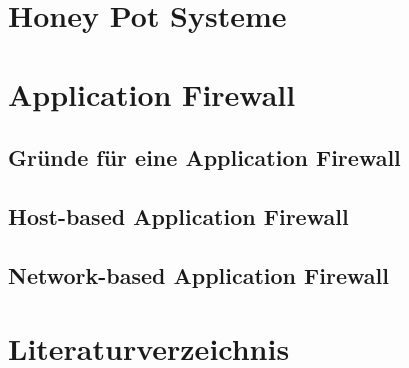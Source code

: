 \documentclass[11pt]{scrartcl}
\begin{document}
\section{Honey Pot Systeme}
\label{sec:honey pot systems}

\section{Application Firewall}
\label{sec:application firewall}

\subsection{Gründe für eine Application Firewall}
\label{sec:reasons AF}

\subsection{Host-based Application Firewall}
\label{sec:host-based application firewall}

\subsection{Network-based Application Firewall}
\label{sec:network-based application firewall}

\section{Literaturverzeichnis}
\label{sec:bibliography}


\newpage
\mbox{}
\nocite{*}


\end{document}

